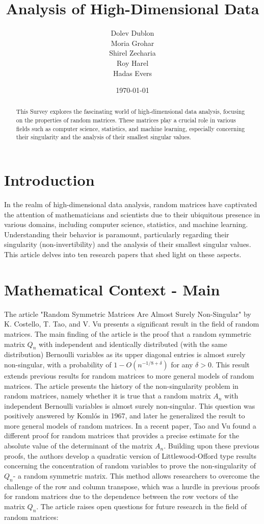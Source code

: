 \documentclass[12pt]{article}
\title{\textbf{Analysis of High-Dimensional Data}}
\author{
    Dolev Dublon\\
    Moria Grohar\\
    Shirel Zecharia\\
    Roy Harel\\
    Hadas Evers
}
\date{\today}
\begin{document}
\maketitle

\begin{abstract}
    This Survey explores the fascinating world of high-dimensional data analysis, focusing on the properties of random matrices. These matrices play a crucial role in various fields such as computer science, statistics, and machine learning, especially concerning their singularity and the analysis of their smallest singular values.
\end{abstract}

\section{Introduction}

In the realm of high-dimensional data analysis, random matrices have captivated the attention of mathematicians and scientists due to their ubiquitous presence in various domains, including computer science, statistics, and machine learning. Understanding their behavior is paramount, particularly regarding their singularity (non-invertibility) and the analysis of their smallest singular values. This article delves into ten research papers that shed light on these aspects.

\section{Mathematical Context - Main}

The article "Random Symmetric Matrices Are Almost Surely Non-Singular"
by K. Costello, T. Tao, and V. Vu presents a significant result in the
field of random matrices. The main finding of the article is the proof
that a random symmetric matrix $ Q_n $ with independent and identically distributed 
(with the same distribution) Bernoulli variables as its upper diagonal entries
is almost surely non-singular, with a probability of $ 1-O(n^{-1/8+\delta}) $  for any $ \delta > 0 $.
This result extends previous results for random matrices to more general models of random matrices.
The article presents the history of the non-singularity problem in random matrices,
namely whether it is true that a random matrix $ A_n $ with independent Bernoulli variables
is almost surely non-singular. This question was positively answered by Komlós in 1967,
and later he generalized the result to more general models of random matrices. In a recent paper,
Tao and Vu found a different proof for random matrices that 
provides a precise estimate for the absolute value of the determinant of the matrix $ A_n $.
Building upon these previous proofs, the authors develop a quadratic version of 
Littlewood-Offord type results concerning the concentration of random variables to prove 
the non-singularity of $ Q_n $- a  random symmetric matrix.
This method allows researchers to overcome the challenge of the row and column 
transpose, which was a hurdle in previous proofs for random matrices due to the 
dependence between the row vectors of the matrix $ Q_n $.
The article raises open questions for future research in the field of random matrices:
\end{document}
